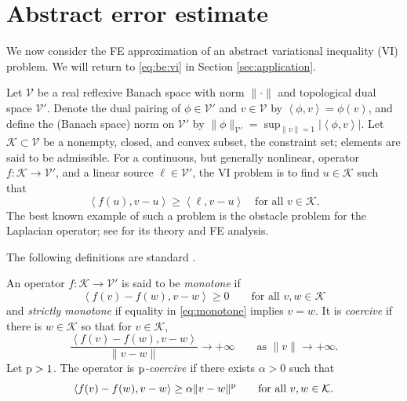 \documentclass[hidelinks,onefignum,onetabnum,final]{siamart220329}  %
\newcommand{\cK}{\mathcal{K}}
\newcommand{\cV}{\mathcal{V}}
\newcommand{\pp}{{\text{\textnormal{p}}}}
\newcommand{\ip}[2]{\left<#1,#2\right>}
\begin{document}
\section{Abstract error estimate} \label{sec:abstractestimate}

We now consider the FE approximation of an abstract variational inequality (VI) problem.  We will return to \eqref{eq:be:vi} in Section \ref{sec:application}.

Let $\cV$ be a real reflexive Banach space with norm $\|\cdot\|$ and topological dual space $\cV'$.  Denote the dual pairing of $\phi \in \cV'$ and $v\in\cV$ by $\ip{\phi}{v} = \phi(v)$, and define the (Banach space) norm on $\cV'$ by $\|\phi\|_{\cV'} = \sup_{\|v\|=1} |\!\ip{\phi}{v}\!|$.  Let $\cK \subset \cV$ be a nonempty, closed, and convex subset, the constraint set; elements are said to be admissible.  For a continuous, but generally nonlinear, operator $f:\cK \to \cV'$, and a linear source $\ell\in \cV'$, the VI problem is to find $u\in \cK$ such that
\begin{equation}
\ip{f(u)}{v-u} \ge \ip{\ell}{v-u} \quad \text{for all } v\in \cK. \label{eq:vi}
\end{equation}
The best known example of such a problem is the obstacle problem for the Laplacian operator; see \cite{Ciarlet2002,Evans2010,KinderlehrerStampacchia1980} for its theory and FE analysis.

The following definitions are standard \cite[Chapter III]{KinderlehrerStampacchia1980}.

\begin{definition} \label{def:monotonepcoercive}
An operator $f:\cK \to \cV'$ is said to be \emph{monotone} if
\begin{equation}
\ip{f(v)-f(w)}{v-w} \ge 0 \qquad \text{for all } v,w \in \cK \label{eq:monotone}
\end{equation}
and \emph{strictly monotone} if equality in \eqref{eq:monotone} implies $v=w$.  It is \emph{coercive} if there is $w\in \cK$ so that for $v \in \cK$,
\begin{equation}
\frac{\ip{f(v)-f(w)}{v-w}}{\|v-w\|} \to +\infty \qquad \text{as } \|v\| \to +\infty. \label{eq:coercive}
\end{equation}
Let $\pp>1$.  The operator is \emph{$\pp$-coercive \cite{Bueler2021conservation}} if there exists $\alpha>0$ such that
\begin{equation}
\ip{f(v)-f(w)}{v-w} \ge \alpha \|v-w\|^\pp \qquad \text{for all } v,w \in \cK. \label{eq:pcoercive}
\end{equation}
\end{definition}
\end{document}
